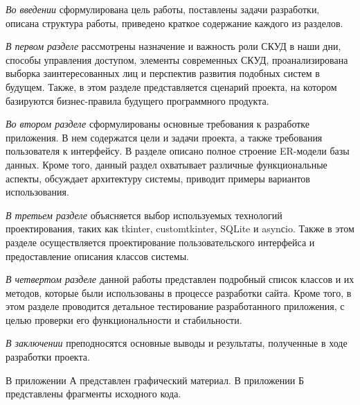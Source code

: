 \emph{Во введении} сформулирована цель работы, поставлены задачи разработки, описана структура работы, приведено краткое содержание каждого из разделов.

\emph{В первом разделе} рассмотрены назначение и важность роли СКУД в наши дни, способы управления доступом, элементы современных СКУД, проанализирована выборка заинтересованных лиц и перспектив развития подобных систем в будущем. Также, в этом разделе представляется сценарий проекта, на котором базируются бизнес-правила будущего программного продукта.

\emph{Во втором разделе} сформулированы основные требования к разработке приложения. В нем содержатся цели и задачи проекта, а также требования пользователя к интерфейсу. В разделе описано полное строение ER-модели базы данных. Кроме того, данный раздел охватывает различные функциональные аспекты, обсуждает архитектуру системы, приводит примеры вариантов использования.

\emph{В третьем разделе} объясняется выбор используемых технологий проектирования, таких как tkinter, customtkinter, SQLite и asynсio. Также в этом разделе осуществляется проектирование пользовательского интерфейса и предоставление описания классов системы.

\emph{В четвертом разделе} данной работы представлен подробный список классов и их методов, которые были использованы в процессе разработки сайта. Кроме того, в этом разделе проводится детальное тестирование разработанного приложения, с целью проверки его функциональности и стабильности.

\emph{В заключении} преподносятся основные выводы и результаты, полученные в ходе разработки проекта.

В приложении А представлен графический материал.
В приложении Б представлены фрагменты исходного кода. 
